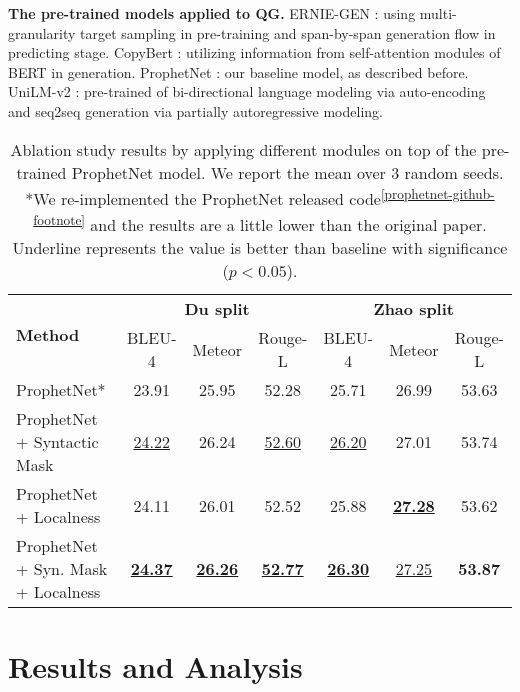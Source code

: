 \documentclass[11pt]{article}
\begin{document}
\textbf{The pre-trained models applied to QG.} ERNIE-GEN \citep{ijcai2020-553}: using multi-granularity target sampling in pre-training and span-by-span generation flow in predicting stage. CopyBert \citep{varanasi-etal-2020-copybert}: utilizing information from self-attention modules of BERT in generation. ProphetNet \citep{qi-etal-2020-prophetnet}: our baseline model, as described before. UniLM-v2 \citep{bao2020unilmv2}: pre-trained of bi-directional language modeling via auto-encoding and seq2seq generation via partially autoregressive modeling.

\begin{table*}[t]
\centering
\small
\begin{tabular}{@{}l|cccccc@{}}
\toprule[1pt]
\multicolumn{1}{l|}{\multirow{2}{*}{\textbf{Method}}} & \multicolumn{3}{c|}{\textbf{Du split}}               & \multicolumn{3}{c}{\textbf{Zhao split}} \\
\multicolumn{1}{c|}{}        & BLEU-4 & Meteor & \multicolumn{1}{c|}{Rouge-L} & BLEU-4 & Meteor & Rouge-L \\ \midrule

ProphetNet*                  & 23.91  & 25.95  & \multicolumn{1}{c|}{52.28}   & 25.71  & 26.99  & 53.63   \\
ProphetNet + Syntactic Mask & \underline{24.22}  & 26.24  & \multicolumn{1}{c|}{\underline{52.60}}   & \underline{26.20}  & 27.01  & 53.74   \\
ProphetNet + Localness      & 24.11  & 26.01  & \multicolumn{1}{c|}{52.52}   & 25.88  & \underline{\textbf{27.28}}  & 53.62   \\
ProphetNet + Syn. Mask + Localness          & \underline{\textbf{24.37}} & \underline{\textbf{26.26}} & \multicolumn{1}{c|}{\underline{\textbf{52.77}}} & \underline{\textbf{26.30}} & \underline{27.25}    & \textbf{53.87} 
\\ \bottomrule[1pt]
\end{tabular}
\caption{Ablation study results by applying different modules on top of the pre-trained ProphetNet model. We report the mean over 3 random seeds. *We re-implemented the ProphetNet released code\textsuperscript{\ref{prophetnet-github-footnote}} and the results are a little lower than the original paper. Underline represents the value is better than baseline with significance ($p < 0.05$).}
\label{ablation-table}
\end{table*}

\section{Results and Analysis}
\end{document}
